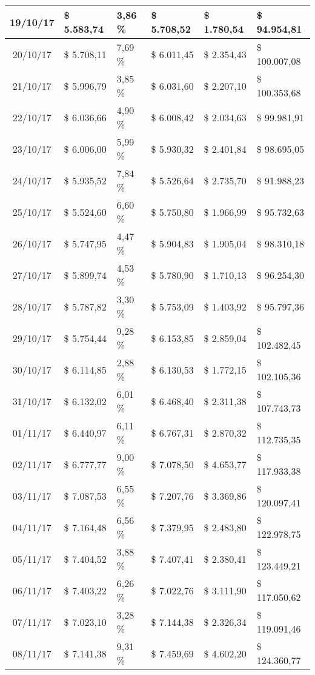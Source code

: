 \begin{small}
\begin{longtable}{|c|l|l|l|l|l|}
19/10/17 & \$ 5.583,74 & 3,86 \% & \$ 5.708,52 & \$ 1.780,54 & \$ 94.954,81 \\ \hline
20/10/17 & \$ 5.708,11 & 7,69 \% & \$ 6.011,45 & \$ 2.354,43 & \$ 100.007,08 \\ \hline
21/10/17 & \$ 5.996,79 & 3,85 \% & \$ 6.031,60 & \$ 2.207,10 & \$ 100.353,68 \\ \hline
22/10/17 & \$ 6.036,66 & 4,90 \% & \$ 6.008,42 & \$ 2.034,63 & \$ 99.981,91 \\ \hline
23/10/17 & \$ 6.006,00 & 5,99 \% & \$ 5.930,32 & \$ 2.401,84 & \$ 98.695,05 \\ \hline
24/10/17 & \$ 5.935,52 & 7,84 \% & \$ 5.526,64 & \$ 2.735,70 & \$ 91.988,23 \\ \hline
25/10/17 & \$ 5.524,60 & 6,60 \% & \$ 5.750,80 & \$ 1.966,99 & \$ 95.732,63 \\ \hline
26/10/17 & \$ 5.747,95 & 4,47 \% & \$ 5.904,83 & \$ 1.905,04 & \$ 98.310,18 \\ \hline
27/10/17 & \$ 5.899,74 & 4,53 \% & \$ 5.780,90 & \$ 1.710,13 & \$ 96.254,30 \\ \hline
28/10/17 & \$ 5.787,82 & 3,30 \% & \$ 5.753,09 & \$ 1.403,92 & \$ 95.797,36 \\ \hline
29/10/17 & \$ 5.754,44 & 9,28 \% & \$ 6.153,85 & \$ 2.859,04 & \$ 102.482,45 \\ \hline
30/10/17 & \$ 6.114,85 & 2,88 \% & \$ 6.130,53 & \$ 1.772,15 & \$ 102.105,36 \\ \hline
31/10/17 & \$ 6.132,02 & 6,01 \% & \$ 6.468,40 & \$ 2.311,38 & \$ 107.743,73 \\ \hline
01/11/17 & \$ 6.440,97 & 6,11 \% & \$ 6.767,31 & \$ 2.870,32 & \$ 112.735,35 \\ \hline
02/11/17 & \$ 6.777,77 & 9,00 \% & \$ 7.078,50 & \$ 4.653,77 & \$ 117.933,38 \\ \hline
03/11/17 & \$ 7.087,53 & 6,55 \% & \$ 7.207,76 & \$ 3.369,86 & \$ 120.097,41 \\ \hline
04/11/17 & \$ 7.164,48 & 6,56 \% & \$ 7.379,95 & \$ 2.483,80 & \$ 122.978,75 \\ \hline
05/11/17 & \$ 7.404,52 & 3,88 \% & \$ 7.407,41 & \$ 2.380,41 & \$ 123.449,21 \\ \hline
06/11/17 & \$ 7.403,22 & 6,26 \% & \$ 7.022,76 & \$ 3.111,90 & \$ 117.050,62 \\ \hline
07/11/17 & \$ 7.023,10 & 3,28 \% & \$ 7.144,38 & \$ 2.326,34 & \$ 119.091,46 \\ \hline
08/11/17 & \$ 7.141,38 & 9,31 \% & \$ 7.459,69 & \$ 4.602,20 & \$ 124.360,77 \\ \hline

\end{longtable}
\end{small}
